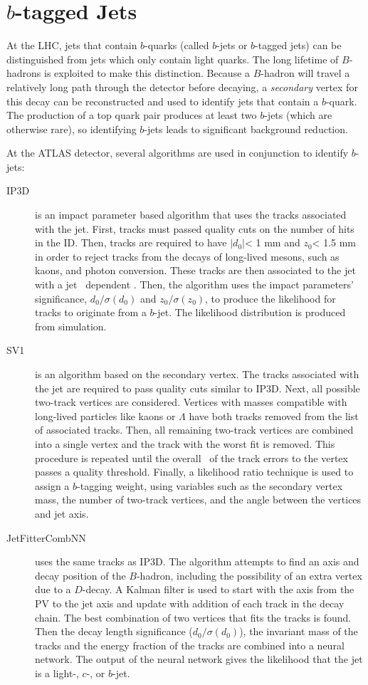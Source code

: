 \section{$b$-tagged Jets}
At the LHC, jets that contain $b$-quarks (called $b$-jets or $b$-tagged jets) can be distinguished from jets which only contain light quarks\cite{btagcom,btagptrel}. The long lifetime of $B$-hadrons is exploited to make this distinction. Because a $B$-hadron will travel a relatively long path through the detector before decaying, a \emph{secondary} vertex for this decay can be reconstructed and used to identify jets that contain a $b$-quark. The production of a top quark pair produces at least two $b$-jets (which are otherwise rare), so identifying $b$-jets leads to significant background reduction. 

At the ATLAS detector, several algorithms are used in conjunction to identify $b$-jets:
\begin{description}
\item[IP3D] is an impact parameter based algorithm that uses the tracks associated with the jet. First, tracks must passed quality cuts on the number of hits in the ID. Then, tracks are required to have $|d_0|$< 1 mm and $z_0$< 1.5 mm in order to reject tracks from the decays of long-lived mesons, such as kaons, and photon conversion. These tracks are then associated to the jet with a jet \pt\ dependent \dR. Then, the algorithm uses the impact parameters' significance, $d_0/\sigma(d_0)$ and $z_0/\sigma(z_0)$, to produce the likelihood for tracks to originate from a $b$-jet. The likelihood distribution is produced from simulation.
\item[SV1] is an algorithm based on the secondary vertex. The tracks associated with the jet are required to pass quality cuts similar to IP3D. Next, all possible two-track vertices are considered. Vertices with masses compatible with long-lived particles like kaons or $\Lambda$ have both tracks removed from the list of associated tracks. Then, all remaining two-track vertices are combined into a single vertex and the track with the worst fit is removed. This procedure is repeated until the overall \chisq\ of the track errors to the vertex passes a quality threshold. Finally, a likelihood ratio technique is used to assign a $b$-tagging weight, using variables such as the secondary vertex mass, the number of two-track vertices, and the angle between the vertices and jet axis.

\item[JetFitterCombNN] uses the same tracks as IP3D. The algorithm attempts to find an axis and decay position of the $B$-hadron, including the possibility of an extra vertex due to a $D$-decay. A Kalman filter is used to start with the axis from the PV to the jet axis and update with addition of each track in the decay chain. The best combination of two vertices that fits the tracks is found. Then the decay length significance ($d_0/\sigma(d_0)$), the invariant mass of the tracks and the energy fraction of the tracks are combined into a neural network. The output of the neural network gives the likelihood that the jet is a light-, $c$-, or $b$-jet.
\end{description}




